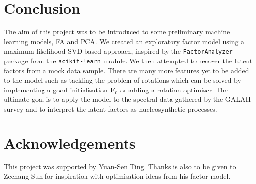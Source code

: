 \documentclass[12pt, letterpaper]{article}
\begin{document}
\section{Conclusion}

The aim of this project was to be introduced to some preliminary machine learning models, FA and PCA. We created an exploratory factor model using a maximum likelihood SVD-based approach, inspired by the \texttt{FactorAnalyzer} package from the \texttt{scikit-learn} module. We then attempted to recover the latent factors from a mock data sample. There are many more features yet to be added to the model such as tackling the problem of rotations which can be solved by implementing a good initialisation $\mathbf{F}_0$ or adding a rotation optimiser. The ultimate goal is to apply the model to the spectral data gathered by the GALAH survey and to interpret the latent factors as nucleosynthetic processes.

\section{Acknowledgements}

This project was supported by Yuan-Sen Ting. Thanks is also to be given to Zechang Sun for inspiration with optimisation ideas from his factor model.

\pagebreak



\end{document}
